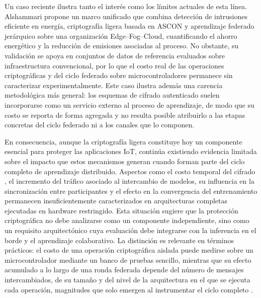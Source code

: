 \documentclass[journal,article,submit,moreauthors]{Definitions/mdpi}
\begin{document}
Un caso reciente ilustra tanto el interés como los límites actuales de esta línea. Alshammari \cite{Alshammari2026} propone un marco unificado que combina detección de intrusiones eficiente en energía, criptografía ligera basada en ASCON y aprendizaje federado jerárquico sobre una organización Edge--Fog--Cloud, cuantificando el ahorro energético y la reducción de emisiones asociadas al proceso. No obstante, su validación se apoya en conjuntos de datos de referencia evaluados sobre infraestructura convencional, por lo que el costo real de las operaciones criptográficas y del ciclo federado sobre microcontroladores permanece sin caracterizar experimentalmente. Este caso ilustra además una carencia metodológica más general: los esquemas de cifrado autenticado suelen incorporarse como un servicio externo al proceso de aprendizaje, de modo que su costo se reporta de forma agregada y no resulta posible atribuirlo a las etapas concretas del ciclo federado ni a los canales que lo componen.

En consecuencia, aunque la criptografía ligera constituye hoy un componente esencial para proteger las aplicaciones IoT, continúa existiendo evidencia limitada sobre el impacto que estos mecanismos generan cuando forman parte del ciclo completo de aprendizaje distribuido. Aspectos como el costo temporal del cifrado \cite{Sorescu2025}, el incremento del tráfico asociado al intercambio de modelos, su influencia en la sincronización entre participantes y el efecto en la convergencia del entrenamiento permanecen insuficientemente caracterizados en arquitecturas completas ejecutadas en hardware restringido. Esta situación sugiere que la protección criptográfica no debe analizarse como un componente independiente, sino como un requisito arquitectónico cuya evaluación debe integrarse con la inferencia en el borde y el aprendizaje colaborativo. La distinción es relevante en términos prácticos: el costo de una operación criptográfica aislada puede medirse sobre un microcontrolador mediante un banco de pruebas sencillo, mientras que su efecto acumulado a lo largo de una ronda federada depende del número de mensajes intercambiados, de su tamaño y del nivel de la arquitectura en el que se ejecuta cada operación, magnitudes que solo emergen al instrumentar el ciclo completo \cite{Alshammari2026}.
\end{document}
